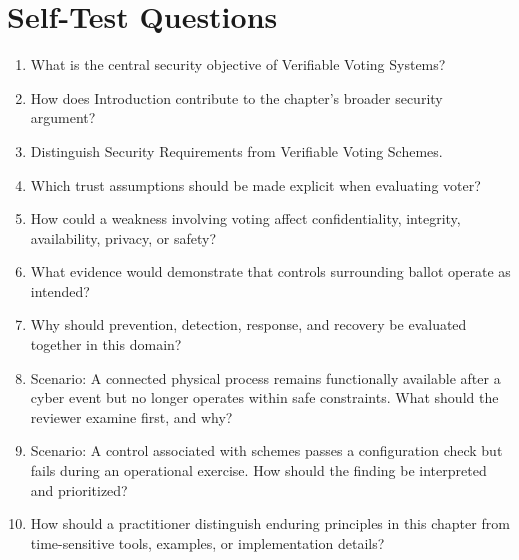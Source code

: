 \documentclass[11pt]{article}
\begin{document}
\section*{Self-Test Questions}
\begin{enumerate}
\item What is the central security objective of Verifiable Voting Systems?
\item How does Introduction contribute to the chapter's broader security argument?
\item Distinguish Security Requirements from Verifiable Voting Schemes.
\item Which trust assumptions should be made explicit when evaluating voter?
\item How could a weakness involving voting affect confidentiality, integrity, availability, privacy, or safety?
\item What evidence would demonstrate that controls surrounding ballot operate as intended?
\item Why should prevention, detection, response, and recovery be evaluated together in this domain?
\item Scenario: A connected physical process remains functionally available after a cyber event but no longer operates within safe constraints. What should the reviewer examine first, and why?
\item Scenario: A control associated with schemes passes a configuration check but fails during an operational exercise. How should the finding be interpreted and prioritized?
\item How should a practitioner distinguish enduring principles in this chapter from time-sensitive tools, examples, or implementation details?
\end{enumerate}
\end{document}
